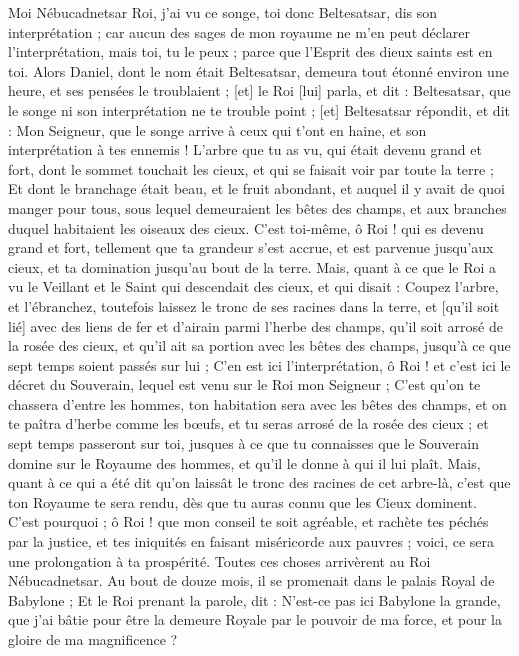 \begin{multicols}{2}
Moi Nébucadnetsar Roi, j'ai vu ce songe, toi donc Beltesatsar, dis son interprétation ; car aucun des sages de mon royaume ne m'en peut déclarer l'interprétation, mais toi, tu le peux ; parce que l'Esprit des dieux saints est en toi.
Alors Daniel, dont le nom était Beltesatsar, demeura tout étonné environ une heure, et ses pensées le troublaient ; [et] le Roi [lui] parla, et dit : Beltesatsar, que le songe ni son interprétation ne te trouble point ; [et] Beltesatsar répondit, et dit : Mon Seigneur, que le songe arrive à ceux qui t'ont en haine, et son interprétation à tes ennemis !
L'arbre que tu as vu, qui était devenu grand et fort, dont le sommet touchait les cieux, et qui se faisait voir par toute la terre ;
Et dont le branchage était beau, et le fruit abondant, et auquel il y avait de quoi manger pour tous, sous lequel demeuraient les bêtes des champs, et aux branches duquel habitaient les oiseaux des cieux.
C'est toi-même, ô Roi ! qui es devenu grand et fort, tellement que ta grandeur s'est accrue, et est parvenue jusqu'aux cieux, et ta domination jusqu'au bout de la terre.
Mais, quant à ce que le Roi a vu le Veillant et le Saint qui descendait des cieux, et qui disait : Coupez l'arbre, et l'ébranchez, toutefois laissez le tronc de ses racines dans la terre, et [qu'il soit lié] avec des liens de fer et d'airain parmi l'herbe des champs, qu'il soit arrosé de la rosée des cieux, et qu'il ait sa portion avec les bêtes des champs, jusqu'à ce que sept temps soient passés sur lui ;
C'en est ici l'interprétation, ô Roi ! et c'est ici le décret du Souverain, lequel est venu sur le Roi mon Seigneur ;
C'est qu'on te chassera d'entre les hommes, ton habitation sera avec les bêtes des champs, et on te paîtra d'herbe comme les bœufs, et tu seras arrosé de la rosée des cieux ; et sept temps passeront sur toi, jusques à ce que tu connaisses que le Souverain domine sur le Royaume des hommes, et qu'il le donne à qui il lui plaît.
Mais, quant à ce qui a été dit qu'on laissât le tronc des racines de cet arbre-là, c'est que ton Royaume te sera rendu, dès que tu auras connu que les Cieux dominent.
C'est pourquoi ; ô Roi ! que mon conseil te soit agréable, et rachète tes péchés par la justice, et tes iniquités en faisant miséricorde aux pauvres ; voici, ce sera une prolongation à ta prospérité.
Toutes ces choses arrivèrent au Roi Nébucadnetsar.
Au bout de douze mois, il se promenait dans le palais Royal de Babylone ;
Et le Roi prenant la parole, dit : N'est-ce pas ici Babylone la grande, que j'ai bâtie pour être la demeure Royale par le pouvoir de ma force, et pour la gloire de ma magnificence ?

\end{multicols}
